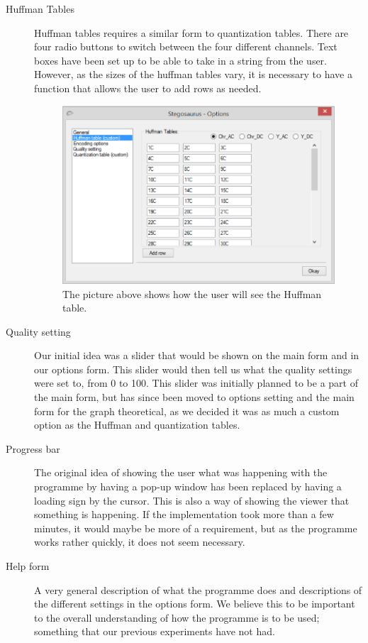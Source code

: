 \begin{description}
\item[Huffman Tables]
Huffman tables requires a similar form to quantization tables.
There are four radio buttons to switch between the four different channels.
Text boxes have been set up to be able to take in a string from the user.
However, as the sizes of the huffman tables vary, it is necessary to have a function that allows the user to add rows as needed.

\begin{figure}
	\centering
	\includegraphics[width=1\textwidth]{figures/StegoOptionHuff.png}
	\caption{The picture above shows how the user will see the Huffman table.}
	\label{fig:StegoOptionHuff}
\end{figure}

\item[Quality setting]
Our initial idea was a slider that would be shown on the main form and in our options form.
This slider would then tell us what the quality settings were set to, from 0 to 100.
This slider was initially planned to be a part of the main form, but has since been moved to options setting and the main form for the graph theoretical, as we decided it was as much a custom option as the Huffman and quantization tables.

\item[Progress bar]
The original idea of showing the user what was happening with the programme by having a pop-up window has been replaced by having a loading sign by the cursor.
This is also a way of showing the viewer that something is happening.
If the implementation took more than a few minutes, it would maybe be more of a requirement, but as the programme works rather quickly, it does not seem necessary.

\item[Help form]
A very general description of what the programme does and descriptions of the different settings in the options form.
We believe this to be important to the overall understanding of how the programme is to be used; something that our previous experiments have not had.
\end{description}

